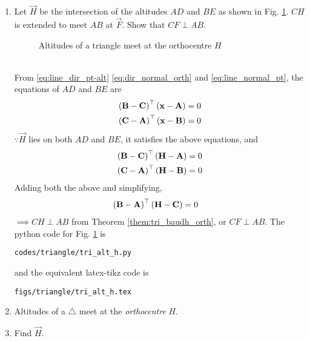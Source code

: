 \begin{enumerate}[label=\thesection.\arabic*.,ref=\thesection.\theenumi]
\item Let $\vec{H}$ be the intersection of the altitudes $AD$ and $BE$ as shown in Fig. \ref{fig:tri_alt_h}.  $CH$ is extended to meet $AB$ at $\vec{F}$.  Show that $CF \perp AB$.
%
\begin{figure}[!ht]
	\begin{center}
		\resizebox{\columnwidth}{!}{}
	\end{center}
	\caption{Altitudes of a triangle meet at the orthocentre $H$}
	\label{fig:tri_alt_h}	
\end{figure}
%
\\
\solution 
From \eqref{eq:line_dir_pt-alt}
\eqref{eq:dir_normal_orth}
and 
\eqref{eq:line_normal_pt},
the equations of $AD$ and $BE$ are 
%
\begin{align}
\left(\mathbf{B}-\mathbf{C}\right)^{\top}\left(\mathbf{x}-\mathbf{A}\right) &= 0  
\\
\left(\mathbf{C}-\mathbf{A}\right)^{\top}\left(\mathbf{x}-\mathbf{B}\right) &= 0  
\end{align}
%
 $\because \vec{H}$ lies on both $AD$ and $BE$, it satisfies the above equations, and 
%
\begin{align}
\left(\mathbf{B}-\mathbf{C}\right)^{\top}\left(\mathbf{H}-\mathbf{A}\right) &= 0  
\\
\left(\mathbf{C}-\mathbf{A}\right)^{\top}\left(\mathbf{H}-\mathbf{B}\right) &= 0  
\end{align}
%
Adding both the above and simplifying, 
%
\begin{align}
\left(\mathbf{B}-\mathbf{A}\right)^{\top}\left(\mathbf{H}-\mathbf{C}\right) &= 0  
\end{align}
%
$\implies CH \perp AB$ from Theorem \ref{them:tri_baudh_orth}, or $CF \perp AB$.  
%
The python code for  Fig. \ref{fig:tri_alt_h} is
\begin{lstlisting}
codes/triangle/tri_alt_h.py
\end{lstlisting}
%
and the equivalent latex-tikz code is
%
\begin{lstlisting}
figs/triangle/tri_alt_h.tex
\end{lstlisting}

\item Altitudes of a $\triangle$ meet at the {\em orthocentre} $H$.
%
\item Find $\vec{H}$.
\end{enumerate}
